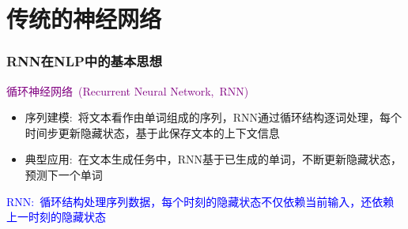%
%
\section{传统的神经网络}
\begin{frame}
	\frametitle{\textrm{RNN}在\textrm{NLP}中的基本思想}
	\textcolor{purple}{循环神经网络~\textrm{(Recurrent Neural Network,~RNN)}}
    \begin{itemize}
		\setlength{\itemsep}{10pt}
    \item 序列建模:~将文本看作由单词组成的序列，\textrm{RNN}通过循环结构逐词处理，每个时间步更新隐藏状态，基于此保存文本的上下文信息\\
	    {\fontsize{7.2pt}{6.2pt}\selectfont{隐藏状态不仅受当前单词影响，还依赖之前单词的信息，借此模拟人类语言理解过程中的记忆功能}}
    \item 典型应用:~在文本生成任务中，\textrm{RNN}基于已生成的单词，不断更新隐藏状态，预测下一个单词\\
	    {\fontsize{7.2pt}{6.2pt}}
    \end{itemize}
    \textcolor{blue}{\textrm{RNN}:~循环结构处理序列数据，每个时刻的隐藏状态不仅依赖当前输入，还依赖上一时刻的隐藏状态}\\
    \vskip 2pt
    {\fontsize{8.2pt}{6.2pt}}
\end{frame}

